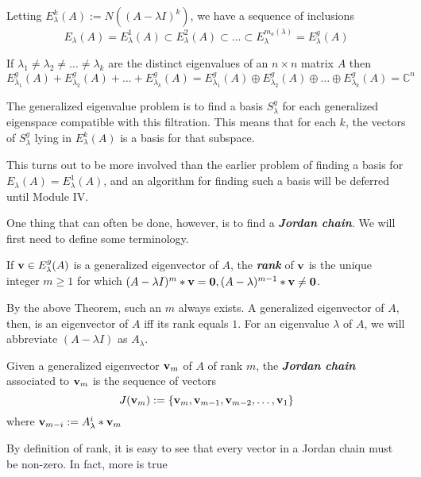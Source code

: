 \documentclass{ximera}
\begin{document}
Letting $E_\lambda^k(A) := N\left((A - \lambda I)^{k}\right)$, we have a sequence of inclusions
\[
E_\lambda(A) = E^1_\lambda(A)\subset E_\lambda^2(A)\subset\dots\subset E_\lambda^{m_a(\lambda)} = E^g_\lambda(A)
\]

\begin{theorem} If $\lambda_1\ne \lambda_2\ne\dots\ne \lambda_k$ are the distinct eigenvalues of an $n\times n$ matrix $A$ then
\[
E^g_{\lambda_1}(A) + E^g_{\lambda_2}(A) + \dots + E^g_{\lambda_k}(A) = 
E^g_{\lambda_1}(A)\oplus E^g_{\lambda_2}(A)\oplus \dots \oplus E^g_{\lambda_k}(A) = \mathbb C^n
\]
\end{theorem}



The generalized eigenvalue problem is to find a basis $S^g_\lambda$ for each generalized eigenspace compatible with this filtration. This means that for each $k$, the vectors of $S^g_\lambda$ lying in $E_\lambda^k(A)$ is a basis for that subspace.

This turns out to be more involved than the earlier problem of finding a basis for $E_\lambda(A) = E_\lambda^1(A)$, and an algorithm for finding such a basis will be deferred until Module IV.

One thing that can often be done, however, is to find a \textbf{\textit{Jordan chain}}. We will first need to define some terminology.

\begin{definition} If ${\bf v}\in E^g_\lambda(A)$ is a generalized eigenvector of $A$, the \textbf{\textit{rank}} of ${\bf v}$ is the unique integer $m\ge 1$ for which $(A - \lambda I)^m*{\bf v} = {\bf 0}, (A - \lambda)^{m-1}*{\bf v}\ne {\bf 0}$.
\end{definition}

By the above Theorem, such an $m$ always exists. A generalized eigenvector of $A$, then, is an eigenvector of $A$ iff its rank equals $1$. For an eigenvalue $\lambda$ of $A$, we will abbreviate $(A - \lambda I)$ as $A_\lambda$.

\begin{definition} Given a generalized eigenvector ${\bf v}_m$ of $A$ of rank $m$, the \textbf{\textit{Jordan chain}} associated to ${\bf v}_m$ is the sequence of vectors
\[
J({\bf v}_m) := \{{\bf v}_m,{\bf v}_{m-1},{\bf v}_{m-2},\dots,{\bf v}_1\}
\]
where ${\bf v}_{m-i} := A_\lambda^i*{\bf v}_m$
\end{definition}

By definition of rank, it is easy to see that every vector in a Jordan chain must be non-zero. In fact, more is true
\end{document}
